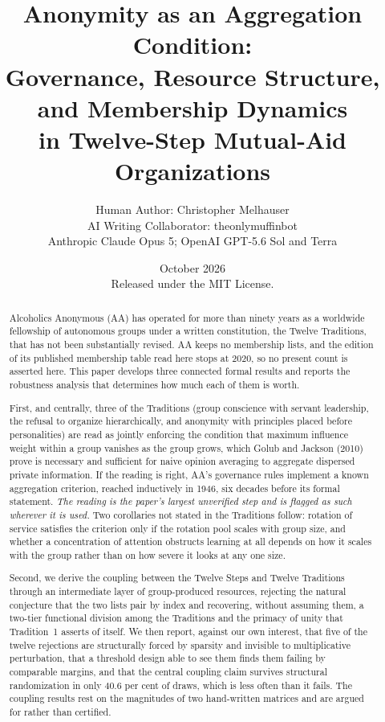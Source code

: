\documentclass[11pt,a4paper]{article}
\title{\bfseries Anonymity as an Aggregation Condition:\\[0.3em]
\large Governance, Resource Structure, and Membership Dynamics\\
in Twelve-Step Mutual-Aid Organizations}
\author{\normalsize Human Author: Christopher Melhauser\\
\normalsize AI Writing Collaborator: theonlymuffinbot\\
\small Anthropic Claude Opus 5; OpenAI GPT-5.6 Sol and Terra}
\date{\normalsize October 2026\\[0.25em]
\small Released under the MIT License.}
\begin{document}
\maketitle

\begin{abstract}
\noindent
Alcoholics Anonymous (AA) has operated for more than ninety years as a worldwide
fellowship of autonomous groups under a written constitution, the Twelve
Traditions, that has not been substantially revised. AA keeps no membership lists,
and the edition of its published membership table read here stops at 2020, so no
present count is asserted here. This paper develops three
connected formal results and reports the robustness analysis that determines how
much each of them is worth.

First, and centrally, three of the Traditions (group conscience with servant
leadership, the refusal to organize hierarchically, and anonymity with principles
placed before personalities) are read as jointly enforcing the condition that
maximum influence weight within a group vanishes as the group grows, which Golub
and Jackson (2010) prove is necessary and sufficient for naive opinion averaging
to aggregate dispersed private information. If the reading is right, AA's
governance rules implement a known aggregation criterion, reached inductively in
1946, six decades before its formal statement. \emph{The reading is the paper's
largest unverified step and is flagged as such wherever it is used.} Two
corollaries not stated in the Traditions follow: rotation of service satisfies the
criterion only if the rotation pool scales with group size, and whether a
concentration of attention obstructs learning at all depends on how it scales with
the group rather than on how severe it looks at any one size.

Second, we derive the coupling between the Twelve Steps and Twelve Traditions
through an intermediate layer of group-produced resources, rejecting the natural
conjecture that the two lists pair by index and recovering, without assuming them,
a two-tier functional division among the Traditions and the primacy of unity that
Tradition~1 asserts of itself. We then report, against our own interest, that
five of the twelve rejections are structurally forced by sparsity and invisible to
multiplicative perturbation, that a threshold design able to see them finds them
failing by comparable margins, and that the central coupling claim survives
structural randomization in only 40.6 per cent of draws, which is less often than
it fails. The coupling results rest on the magnitudes of two hand-written
matrices and are argued for rather than certified.


\end{abstract}
\end{document}
